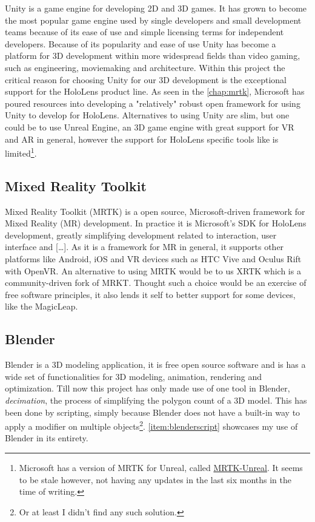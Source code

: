 Unity is a game engine for developing 2D and 3D games. It has grown to become the most popular game engine used by single developers and small development teams because of its ease of use and simple licensing terms for independent developers. Because of its popularity  and ease of use Unity has become a platform for 3D development within more widespread fields than video gaming, such as engineering, moviemaking and architecture. 
Within this project the critical reason for choosing Unity for our 3D development is the exceptional support for the HoloLens product line. As seen in the \autoref{chap:mrtk}, Microsoft has poured resources into developing a "relatively" robust open framework for using Unity to develop for HoloLens. 
Alternatives to using Unity are slim, but one could be to use Unreal Engine, an 3D game engine with great support for VR and AR in general, however the support for HoloLens specific tools like  is limited\footnote{Microsoft has a version of MRTK for Unreal, called \href{https://github.com/microsoft/MixedRealityToolkit-Unreal}{MRTK-Unreal}. It seems to be stale however, not having any updates in the last six months in the time of writing.}.

\subsection*{Mixed Reality Toolkit}\label{chap:mrtk}
Mixed Reality Toolkit (MRTK) is a open source, Microsoft-driven framework for Mixed Reality (MR) development. In practice it is Microsoft's SDK for HoloLens development, greatly simplifying development related to interaction, user interface and  [\dots]. As it is a framework for MR in general, it supports other platforms like Android, iOS and VR devices such as HTC Vive and Oculus Rift with OpenVR. 
An alternative to using MRTK would be to us XRTK which is a community-driven fork of MRKT. Thought such a choice would be an exercise of free software principles, it also lends it self to better support for some devices, like the MagicLeap.



\subsection*{Blender}\label{chap:blender}

Blender is a 3D modeling application, it is free open source software and is has a wide set of functionalities for 3D modeling, animation, rendering and optimization. Till now this project has only made use of one tool in Blender, \textit{decimation}, the process of simplifying the polygon count of a 3D model. This has been done by scripting, simply because Blender does not have a built-in way to apply a modifier on multiple objects\footnote{Or at least I didn't find any such solution.}. \autoref{item:blenderscript} showcases my use of Blender in its entirety.



